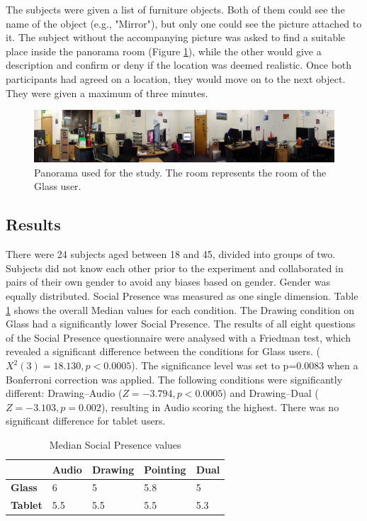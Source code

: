 The subjects were given a list of furniture objects. Both of them could see the name of the object (e.g., "Mirror"), but only one could see the picture attached to it. The subject without the accompanying picture was asked to find a suitable place inside the panorama room (Figure \ref{fig:ismar14:envrionment-setup}), while the other would give a description and confirm or deny if the location was deemed realistic. Once both participants had agreed on a location, they would move on to the next object. They were given a maximum of three minutes.

\begin{figure}[ht]
	\centering
	\includegraphics[width=\linewidth]{images/ismar14/envrionment-setup}
	\caption{Panorama used for the study. The room represents the room of the Glass user.}
	\label{fig:ismar14:envrionment-setup}
\end{figure}

\subsection{Results}

There were 24 subjects aged between 18 and 45, divided into groups of two. Subjects did not know each other prior to the experiment and collaborated in pairs of their own gender to avoid any biases based on gender. Gender was equally distributed. Social Presence was measured as one single dimension. Table \ref{tbl:ismar14-results} shows the overall Median values for each condition. The Drawing condition on Glass had a significantly lower Social Presence. The results of all eight questions of the Social Presence questionnaire were analysed with a Friedman test, which revealed a significant difference between the conditions for Glass users. ($X^2(3)=18.130, p<0.0005$). The significance level was set to p=0.0083 when a Bonferroni correction was applied. The following conditions were significantly different: Drawing–Audio ($Z=-3.794, p<0.0005$) and Drawing–Dual ($Z=-3.103, p=0.002$), resulting in Audio scoring the highest. There was no significant difference for tablet users.

\begin{table}[]
    \caption{Median Social Presence values}
    \centering
    \begin{tabular}{@{}lllll@{}}
    \toprule
    \textbf{}       & \textbf{Audio} & \textbf{Drawing} & \textbf{Pointing} & \textbf{Dual} \\ \midrule
    \textbf{Glass}  & 6              & 5                & 5.8               & 5             \\
    \textbf{Tablet} & 5.5            & 5.5              & 5.5               & 5.3           \\ \bottomrule
    \end{tabular}
    \label{tbl:ismar14-results}
\end{table}

